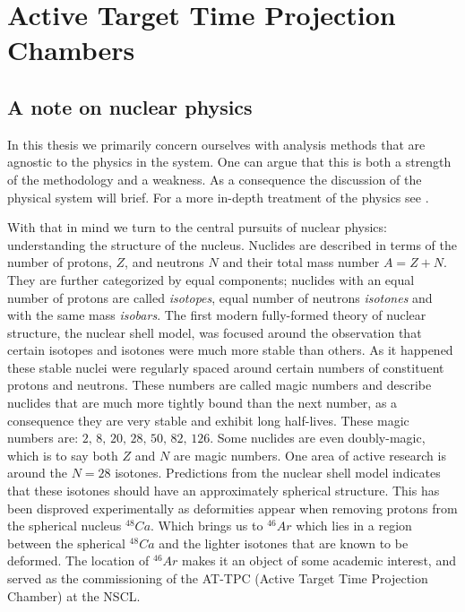 \section{Active Target Time Projection Chambers}\label{sec:attpc}

\subsection{A note on nuclear physics}

In this thesis we primarily concern ourselves with analysis methods that are agnostic to the physics in the system. One can argue that this is both a strength of the methodology and a weakness. As a consequence the discussion of the physical system will brief. For a more in-depth treatment of the physics  see \cite{Bradt2017}. 

With that in mind we turn to the central pursuits of nuclear physics: understanding the structure of the nucleus. Nuclides are described in terms of the number of protons, $Z$, and neutrons $N$ and their total mass number $A = Z +N$. They are further categorized by equal components; nuclides with an equal number of protons are called \textit{isotopes}, equal number of neutrons \textit{isotones} and with the same  mass \textit{isobars}. The first modern fully-formed theory of nuclear structure, the nuclear shell model, was focused around the observation that certain isotopes and isotones were much more stable than others. As it happened these stable nuclei were regularly spaced around certain numbers of constituent protons and neutrons. These numbers are called magic numbers and describe nuclides that are much more tightly bound than the next number, as a consequence they are very stable and exhibit long half-lives. These magic numbers are: $2 ,\, 8 ,\, 20 ,\, 28 ,\, 50 ,\, 82 ,\, 126$. Some nuclides are even doubly-magic, which is to say both $Z$ and $N$ are magic numbers. One area of active research is around the $N=28$ isotones. Predictions from the nuclear shell model indicates that these isotones should have an approximately spherical structure. This has been disproved experimentally as deformities appear when removing protons from the spherical nucleus ${}^{48}Ca$. Which brings us to ${}^{46}Ar$ which lies in a region between the spherical ${}^{48}Ca$ and the lighter isotones that are known to be deformed. The location of ${}^{46}Ar$ makes it an object of some academic interest, and served as the commissioning of the AT-TPC (Active Target Time Projection Chamber) at the NSCL. 

